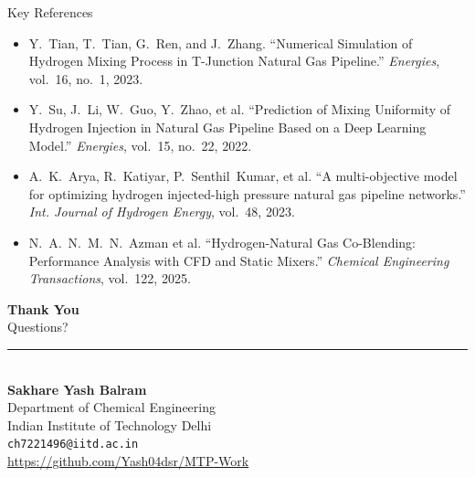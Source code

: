 \documentclass[10pt, aspectratio=169]{beamer}
\begin{document}
\begin{frame}{Key References}
    \small
    \begin{itemize}\setlength{\itemsep}{0.6em}
        \item Y.~Tian, T.~Tian, G.~Ren, and J.~Zhang.
        ``Numerical Simulation of Hydrogen Mixing Process in T-Junction Natural Gas Pipeline.''
        \textit{Energies}, vol.~16, no.~1, 2023.

        \item Y.~Su, J.~Li, W.~Guo, Y.~Zhao, et al.
        ``Prediction of Mixing Uniformity of Hydrogen Injection in Natural Gas Pipeline Based on a Deep Learning Model.''
        \textit{Energies}, vol.~15, no.~22, 2022.

        \item A.~K.~Arya, R.~Katiyar, P.~Senthil~Kumar, et al.
        ``A multi-objective model for optimizing hydrogen injected-high pressure natural gas pipeline networks.''
        \textit{Int. Journal of Hydrogen Energy}, vol.~48, 2023.

        \item N.~A.~N.~M.~N.~Azman et al.
        ``Hydrogen-Natural Gas Co-Blending: Performance Analysis with CFD and Static Mixers.''
        \textit{Chemical Engineering Transactions}, vol.~122, 2025.
    \end{itemize}
\end{frame}

\begin{frame}[plain]
    \vfill
    \begin{center}
        {\fontsize{28}{34}\selectfont\bfseries\color{white}Thank You}\\[16pt]
        {\Large\color{white}Questions?}\\[20pt]
        {\color{white!70}\rule{5cm}{0.5pt}}\\[20pt]
        {\large\color{white}\textbf{Sakhare Yash Balram}}\\[8pt]
        {\normalsize\color{white!90}%
         Department of Chemical Engineering\\
         Indian Institute of Technology Delhi}\\[12pt]
        {\normalsize\color{white!80}%
         \texttt{ch7221496@iitd.ac.in}}\\[8pt]
        {\small\color{white!60}%
         \url{https://github.com/Yash04dsr/MTP-Work}}
    \end{center}
    \vfill
\end{frame}
\end{document}
